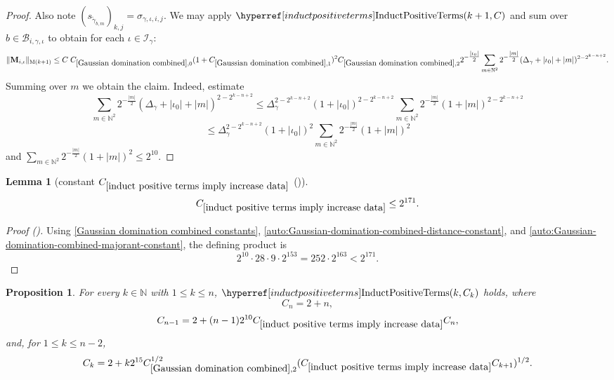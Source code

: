 \documentclass[12pt,reqno]{amsart}
\newcommand{\auto}{{({\tiny\faCar})}}
\theoremstyle{plain}
\newtheorem{lemma}[theorem]{Lemma}
\newtheorem{proposition}[theorem]{Proposition}
\numberwithin{equation}{section}
\theoremstyle{remark}
\newcommand{\using}[1]{}
\newcommand{\N}{{\mathbb N}}
\newcommand{\M}{\mathbf{M}}
\begin{document}
\begin{proof}
Also note $(s_{\widetilde{\gamma}_{b,m}})_{k,j}=\sigma_{\gamma,\iota,i,j}$.
We may apply $\InductPositiveTerms{k+1,C}$ and sum over $b\in \mathcal{B}_{i,\gamma,\iota}$ to obtain for each $\iota\in\mathcal{I}_{\gamma}$:
\[ \|\M_{i,\iota}\|_{{\rm M}(k+1)} \le C\; C_{\ref{Gaussian domination combined},0} (1+C_{\ref{Gaussian domination combined},1})^2 C_{\ref{Gaussian domination combined},2} 2^{-\tfrac{|\iota_0|}{2}} \sum_{m\in\mathbb{N}^2} 2^{-\tfrac{|m|}{2}} (\Delta_\gamma + |\iota_0|+|m|)^{2-2^{k-n+2}}. \]
Summing over $m$ we obtain the claim.
Indeed, estimate
\[ \sum_{m\in\mathbb{N}^2} 2^{-\tfrac{|m|}{2}} (\Delta_\gamma + |\iota_0|+|m|)^{2-2^{k-n+2}} \le \Delta_\gamma^{2-2^{k-n+2}} (1+|\iota_0|)^{2-2^{k-n+2}} \sum_{m\in\N^2} 2^{-\tfrac{|m|}{2}} (1+|m|)^{2-2^{k-n+2}} \]
\[
\leq \Delta_\gamma^{2-2^{k-n+2}} (1+|\iota_0|)^{2} \sum_{m\in\N^2} 2^{-\tfrac{|m|}{2}} (1+|m|)^{2}
\]
and $\sum_{m\in\N^2} 2^{-\frac{|m|}{2}} (1+|m|)^2\le 2^{10}$.
\end{proof}

\begin{lemma}[constant $C_{\ref{induct positive terms imply increase data}}$ \auto]\label{constant induct positive terms imply increase data}\using{Gaussian domination combined}
\begin{equation}\label{constant induct positive terms imply increase data bound}
C_{\ref{induct positive terms imply increase data}}\le2^{171}.
\end{equation}
\end{lemma}
\begin{proof}[Proof \auto]
Using \eqref{Gaussian domination combined constants}, \eqref{auto:Gaussian-domination-combined-distance-constant}, and \eqref{auto:Gaussian-domination-combined-majorant-constant}, the defining product is
\[
2^{10}\cdot28\cdot9\cdot2^{153}
=252\cdot2^{163}
<2^{171}.
\]
\end{proof}


\begin{proposition}\label{P:C_k-induction}\using{vanishing diagonal implies induct positive terms}\using{vanishing kernel integral}\using{induct positive terms imply increase data}\using{increase data implies diagonal band}\using{diagonal band implies vanishing diagonal}
For every $k\in\N$ with $1\le k\le n$, $\InductPositiveTerms{k,C_k}$ holds, where
\begin{equation}\label{auto:positive-induction-recursion}
C_n=2+n,
\end{equation}
\begin{equation}\label{auto:positive-induction-recursion-terminal-step}
C_{n-1}=2+(n-1)2^{10}C_{\ref{induct positive terms imply increase data}}C_n,
\end{equation}
and, for $1\le k\le n-2$,
\begin{equation}\label{auto:positive-induction-recursion-interior-step}
C_k=2+k2^{15}C_{\ref{Gaussian domination combined},2}^{1/2}
(C_{\ref{induct positive terms imply increase data}}C_{k+1})^{1/2}.
\end{equation}
\end{proposition}
\end{document}
